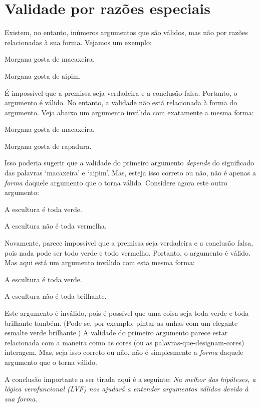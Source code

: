 \section{Validade por razões especiais}
Existem, no entanto, inúmeros argumentos que são válidos, mas não por razões relacionadas à sua forma. Vejamos um exemplo:
	\begin{earg}
		\item[] Morgana gosta de macaxeira.
		\item[\therefore] Morgana gosta de aipim.
	\end{earg}
É impossível que a premissa seja verdadeira e a conclusão falsa.
Portanto, o argumento é válido.
No entanto, a validade não está relacionada à forma do argumento.
Veja abaixo um argumento inválido com exatamente a mesma forma:
	\begin{earg}
		\item[] Morgana gosta de macaxeira.
		\item[\therefore] Morgana gosta de rapadura.
	\end{earg}
Isso poderia sugerir que a validade do primeiro argumento \emph{depende} do significado das palavras `macaxeira' e `aipim'.
Mas, esteja isso correto ou não, não é apenas a \emph{forma} daquele argumento que o torna válido.
Considere agora este outro argumento:
	\begin{earg}
		\item[] A escultura é toda verde.
		\item[\therefore] A escultura não é toda vermelha. 
	\end{earg}
Novamente, parece impossível que a premissa seja verdadeira e a conclusão falsa, pois nada pode ser todo verde e todo vermelho.
Portanto, o argumento é válido.
Mas aqui está um argumento inválido com esta mesma forma:
	\begin{earg}
		\item[] A escultura é toda verde.
		\item[\therefore] A escultura não é toda brilhante.
	\end{earg}
Este argumento é inválido, pois é possível que uma coisa seja toda verde e toda brilhante também.
(Pode-se, por exemplo, pintar as unhas com um elegante esmalte verde brilhante.)
A validade do primeiro argumento parece estar relacionada com a maneira como as cores (ou as palavras-que-designam-cores) interagem.
Mas, seja isso correto ou não, não é simplesmente a \emph{forma} daquele argumento que o torna válido.

A conclusão importante a ser tirada aqui é a seguinte:
\emph{Na melhor das hipóteses, a lógica verofuncional (LVF) nos ajudará a entender argumentos válidos devido à sua forma.}


